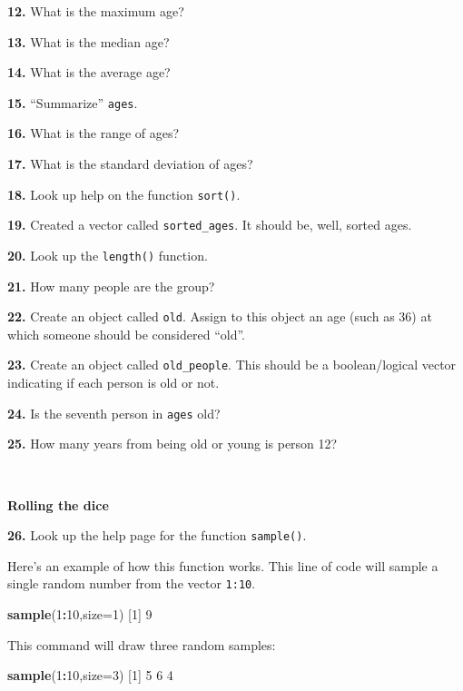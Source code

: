 \documentclass[
]{book}
\newenvironment{Shaded}{\begin{snugshade}}{\end{snugshade}}
\newcommand{\DataTypeTok}[1]{\textcolor[rgb]{0.13,0.29,0.53}{#1}}
\newcommand{\DecValTok}[1]{\textcolor[rgb]{0.00,0.00,0.81}{#1}}
\newcommand{\KeywordTok}[1]{\textcolor[rgb]{0.13,0.29,0.53}{\textbf{#1}}}
\newcommand{\NormalTok}[1]{#1}
\newcommand{\OperatorTok}[1]{\textcolor[rgb]{0.81,0.36,0.00}{\textbf{#1}}}
\begin{document}
\textbf{12.} What is the maximum age?

\textbf{13.} What is the median age?

\textbf{14.} What is the average age?

\textbf{15.} ``Summarize'' \texttt{ages}.

\textbf{16.} What is the range of ages?

\textbf{17.} What is the standard deviation of ages?

\textbf{18.} Look up help on the function \texttt{sort()}.

\textbf{19.} Created a vector called \texttt{sorted\_ages}. It should be, well, sorted ages.

\textbf{20.} Look up the \texttt{length()} function.

\textbf{21.} How many people are the group?

\textbf{22.} Create an object called \texttt{old}. Assign to this object an age (such as 36) at which someone should be considered ``old''.

\textbf{23.} Create an object called \texttt{old\_people}. This should be a boolean/logical vector indicating if each person is old or not.

\textbf{24.} Is the seventh person in \texttt{ages} old?

\textbf{25.} How many years from being old or young is person 12?

~

\textbf{Rolling the dice}

\textbf{26.} Look up the help page for the function \texttt{sample()}.

Here's an example of how this function works. This line of code will sample a single random number from the vector \texttt{1:10}.

\begin{Shaded}
\begin{Highlighting}[]
\KeywordTok{sample}\NormalTok{(}\DecValTok{1}\OperatorTok{:}\DecValTok{10}\NormalTok{,}\DataTypeTok{size=}\DecValTok{1}\NormalTok{)}
\NormalTok{[}\DecValTok{1}\NormalTok{] }\DecValTok{9}
\end{Highlighting}
\end{Shaded}

This command will draw three random samples:

\begin{Shaded}
\begin{Highlighting}[]
\KeywordTok{sample}\NormalTok{(}\DecValTok{1}\OperatorTok{:}\DecValTok{10}\NormalTok{,}\DataTypeTok{size=}\DecValTok{3}\NormalTok{)}
\NormalTok{[}\DecValTok{1}\NormalTok{] }\DecValTok{5} \DecValTok{6} \DecValTok{4}
\end{Highlighting}
\end{Shaded}
\end{document}
